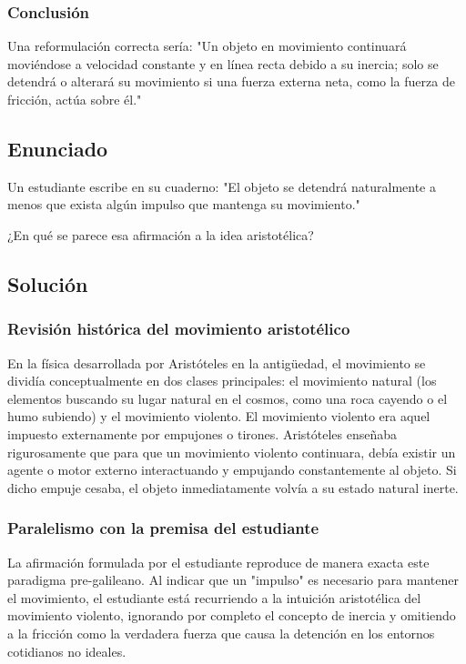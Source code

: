 \documentclass[12pt, a4paper]{article}
\begin{document}
\subsubsection*{Conclusión}
Una reformulación correcta sería: "Un objeto en movimiento continuará moviéndose a velocidad constante y en línea recta debido a su inercia; solo se detendrá o alterará su movimiento si una fuerza externa neta, como la fuerza de fricción, actúa sobre él."

\newpage

\subsection*{Enunciado}
Un estudiante escribe en su cuaderno: "El objeto se detendrá naturalmente a menos que exista algún impulso que mantenga su movimiento."

¿En qué se parece esa afirmación a la idea aristotélica?

\subsection*{Solución}

\subsubsection*{Revisión histórica del movimiento aristotélico}
En la física desarrollada por Aristóteles en la antigüedad, el movimiento se dividía conceptualmente en dos clases principales: el movimiento natural (los elementos buscando su lugar natural en el cosmos, como una roca cayendo o el humo subiendo) y el movimiento violento. El movimiento violento era aquel impuesto externamente por empujones o tirones. Aristóteles enseñaba rigurosamente que para que un movimiento violento continuara, debía existir un agente o motor externo interactuando y empujando constantemente al objeto. Si dicho empuje cesaba, el objeto inmediatamente volvía a su estado natural inerte.

\subsubsection*{Paralelismo con la premisa del estudiante}
La afirmación formulada por el estudiante reproduce de manera exacta este paradigma pre-galileano. Al indicar que un "impulso" es necesario para mantener el movimiento, el estudiante está recurriendo a la intuición aristotélica del movimiento violento, ignorando por completo el concepto de inercia y omitiendo a la fricción como la verdadera fuerza que causa la detención en los entornos cotidianos no ideales.
\end{document}
